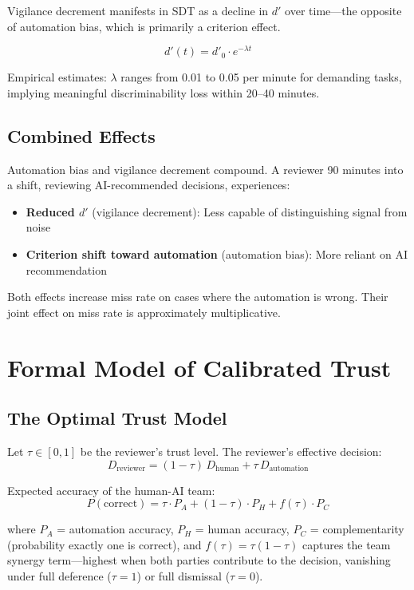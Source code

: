 Vigilance decrement manifests in SDT as a decline in $d'$ over time---the opposite of automation bias, which is primarily a criterion effect.

\[
d'(t) = d'_0 \cdot e^{-\lambda t}
\]

Empirical estimates: $\lambda$ ranges from 0.01 to 0.05 per minute for demanding tasks, implying meaningful discriminability loss within 20--40 minutes.

\subsection{Combined Effects}

Automation bias and vigilance decrement compound. A reviewer 90 minutes into a shift, reviewing AI-recommended decisions, experiences:
\begin{itemize}
    \item \textbf{Reduced $d'$} (vigilance decrement): Less capable of distinguishing signal from noise
    \item \textbf{Criterion shift toward automation} (automation bias): More reliant on AI recommendation
\end{itemize}

Both effects increase miss rate on cases where the automation is wrong. Their joint effect on miss rate is approximately multiplicative.

\section{Formal Model of Calibrated Trust}

\subsection{The Optimal Trust Model}

Let $\tau \in [0,1]$ be the reviewer's trust level. The reviewer's effective decision:
\[
D_{\text{reviewer}} = (1-\tau)\, D_{\text{human}} + \tau\, D_{\text{automation}}
\]

Expected accuracy of the human-AI team:
\[
P(\text{correct}) = \tau \cdot P_A + (1-\tau) \cdot P_H + f(\tau) \cdot P_C
\]

where $P_A$ = automation accuracy, $P_H$ = human accuracy, $P_C$ = complementarity (probability exactly one is correct), and $f(\tau) = \tau(1-\tau)$ captures the team synergy term---highest when both parties contribute to the decision, vanishing under full deference ($\tau = 1$) or full dismissal ($\tau = 0$).

